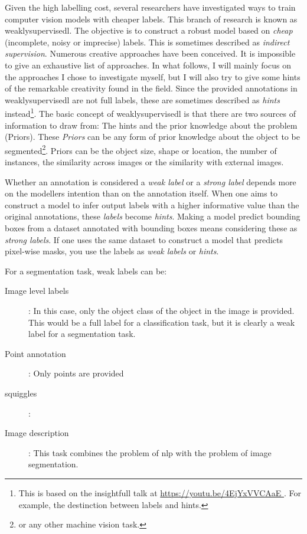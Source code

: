 Given the high labelling cost, several researchers have investigated ways to train computer vision models with cheaper labels.
This branch of research is known as \Gls{weaklysupervisedl}.
The objective is to construct a robust model based on \textit{cheap} (incomplete, noisy or imprecise) labels. 
This is sometimes described as \textit{indirect supervision}.
Numerous creative approaches have been conceived. 
It is impossible to give an exhaustive list of approaches. 
In what follows, I will mainly focus on the approaches I chose to investigate myself, but I will also try to give some hints of the remarkable creativity found in the field.
Since the provided annotations in \Gls{weaklysupervisedl} are not full labels, these are sometimes described as \textit{hints} instead\footnote{
    This is based on the insightfull talk at \url{ 
        https://youtu.be/4EjYxVVCAaE
    }. For example, the destinction between labels and hints.
}.
The basic concept of \Gls{weaklysupervisedl} is that there are two sources of information to draw from: The hints and the prior knowledge about the problem (Priors).
These \textit{Priors} can be any form of prior knowledge about the object to be segmented\footnote{or any other machine vision task.}.
Priors can be the object size, shape or location, the number of instances, the similarity across images or the similarity with external images.

Whether an annotation is considered a \textit{weak label} or a \textit{strong label} depends more on the modellers intention than on the annotation itself. 
When one aims to construct a model to infer output labels with a higher informative value than the original annotations, these \textit{labels} become \textit{hints}.
Making a model predict bounding boxes from a dataset annotated with bounding boxes means considering these as \textit{strong labels}. 
If one uses the same dataset to construct a model that predicts pixel-wise masks, you use the labels as \textit{weak labels} or \textit{hints}.

For a segmentation task, weak labels can be:
\begin{description}
    \item[Image level labels]: In this case, only the object class of the object in the image is provided. 
    This would be a full label for a classification task, but it is clearly a weak label for a segmentation task.
    \item[Point annotation]: Only points are provided
    \item[squiggles]:
    \item[Image description]: This task combines the problem of \acrlong{nlp} with the problem of image segmentation.  
\end{description}

